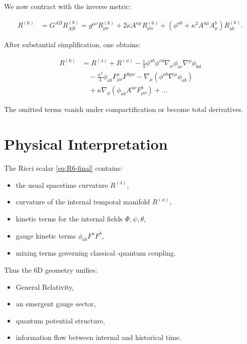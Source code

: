 \documentclass[12pt]{article}
\begin{document}
We now contract with the inverse metric:

\begin{align}
R^{(6)}
&=
G^{AB} R^{(6)}_{AB}
=
g^{\mu\nu}R_{\mu\nu}^{(6)}
+2\kappa A^{a\mu}R^{(6)}_{\mu a}
+(\phi^{ab}+\kappa^2A^{a\mu}A^b_{\mu})R_{ab}^{(6)}.
\end{align}

After substantial simplification, one obtains:

\begin{align}
R^{(6)}
&=
R^{(4)}
+R^{(\phi)}
-\frac{1}{4}\phi^{ab}\phi^{cd}
\nabla_\mu\phi_{ac}\nabla^\mu\phi_{bd}
\nonumber\\
&\quad
-\frac{\kappa^2}{4}\phi_{ab}F^a_{\mu\nu}F^{b\mu\nu}
-\nabla_\mu(\phi^{ab}\nabla^\mu\phi_{ab})
\nonumber\\
&\quad
+ \kappa\nabla_\mu(\phi_{ab}A^{a\nu}F^b_{\mu\nu})
+ \dots
\label{eq:R6-final}
\end{align}

The omitted terms vanish under compactification or become total derivatives.


\newpage
\section{Physical Interpretation}

The Ricci scalar \eqref{eq:R6-final} contains:
\begin{itemize}
\item the usual spacetime curvature \(R^{(4)}\),
\item curvature of the internal temporal manifold \(R^{(\phi)}\),
\item kinetic terms for the internal fields \(\Phi,\psi,\theta\),
\item gauge kinetic terms \(\phi_{ab}F^a F^b\),
\item mixing terms governing classical--quantum coupling.
\end{itemize}

Thus the 6D geometry unifies:
\begin{itemize}
\item General Relativity,
\item an emergent gauge sector,
\item quantum potential structure,
\item information flow between internal and historical time.
\end{itemize}
\end{document}
